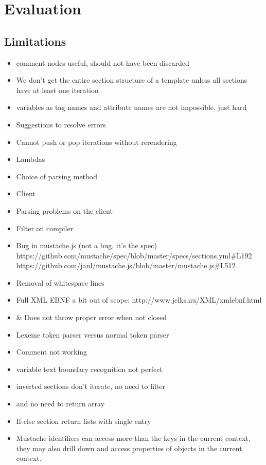 \documentclass[thesis.tex]{subfiles}
\begin{document}
\chapter{Evaluation}
\label{chap:eval}
\section{Limitations}
\begin{itemize}
\item comment nodes useful, should not have been discarded
\item We don't get the entire section structure of a template unless all
      sections have at least one iteration
\item variables as tag names and attribute names are not impossible, just hard
\item Suggestions to resolve errors
\item Cannot push or pop iterations without rerendering
\item Lambdas
\item Choice of parsing method
\item Client
\item Parsing problems on the client
\item Filter on compiler
\item Bug in mustache.js (not a bug, it's the spec)
      https://github.com/mustache/spec/blob/master/specs/sections.yml\#L192
      https://github.com/janl/mustache.js/blob/master/mustache.js\#L512
\item Removal of whitespace lines
\item Full XML EBNF a bit out of scope: http://www.jelks.nu/XML/xmlebnf.html
\item \& Does not throw proper error when not closed
\item Lexeme token parser versus normal token parser
\item Comment not working
\item variable text boundary recognition not perfect
\item inverted sections don't iterate, no need to filter
\item and no need to return array
\item If-else section return lists with single entry
\item Mustache identifiers can access more than the keys in the current context,
      they may also drill down and access properties of objects in the current
      context.
\end{itemize}
\end{document}

